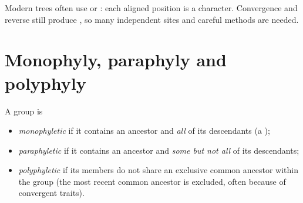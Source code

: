 \begin{remark}\label{rem:g12:phylogeny-macroevolution:molecular}
Modern trees often use  or  : each aligned position
is a character. Convergence and reverse  still produce
, so many independent sites and careful methods are needed.
\end{remark}

\section{Monophyly, paraphyly and polyphyly}

\begin{definition}
\label{def:g12:phylogeny-macroevolution:monophyly}
A group is
\begin{itemize}
  \item \emph{monophyletic} if it contains an
        ancestor and \emph{all} of its descendants (a );
  \item \emph{paraphyletic} if it contains an
        ancestor and \emph{some but not all} of its descendants;
  \item \emph{polyphyletic} if its members do not
        share an exclusive common ancestor within the group (the most
        recent common ancestor is excluded, often because of convergent
        traits).
\end{itemize}
\end{definition}

